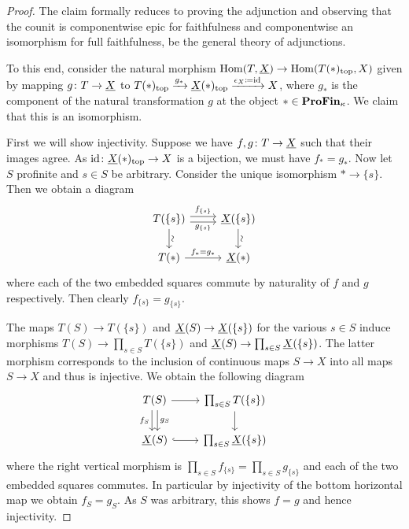 \begin{proof}
	The claim formally reduces to proving the adjunction and observing that the counit is componentwise epic for faithfulness and componentwise an isomorphism for full faithfulness, be the general theory of adjunctions.
	
	To this end, consider the natural morphism ${\operatorname{Hom}}(T, \underline{X}) \to {\operatorname{Hom}}({T(\ast)_\mathrm{top}}, X)$ given by mapping $g\colon T\to \underline{X}$ to ${T(\ast)_\mathrm{top}}\xrightarrow{g_\ast} {\underline{X}(\ast)_\mathrm{top}} \xrightarrow{\epsilon_X\coloneqq\mathrm{id}} X$, where $g_\ast$ is the component of the natural transformation $g$ at the object $\ast\in{\mathbf{ProFin}}_{\kappa}$. We claim that this is an isomorphism.
	
	First we will show injectivity. Suppose we have $f,g\colon T\to\underline{X}$ such that their images agree. As $\mathrm{id}\colon {\underline{X}(\ast)_\mathrm{top}}\to X$ is a bijection, we must have $f_\ast=g_\ast$. Now let $S$ profinite and $s\in S$ be arbitrary. Consider the unique isomorphism $\ast\to\{s\}$. Then we obtain a diagram
	$$\begin{tikzcd}
		T(\{s\})\ar[r, "f_{\{s\}}", shift left=.25em]\ar[r, "g_{\{s\}}", shift right=.25em, swap] \ar[d, "\sim" {rotate=90, anchor=north}]&\associated{X}(\{s\})\ar[d, "\sim" {rotate=90, anchor=north}]\\
		T(\ast)\ar[r, "f_\ast=g_\ast"] &\associated{X}(\ast)
	\end{tikzcd}$$
	where each of the two embedded squares commute by naturality of $f$ and $g$ respectively. Then clearly $f_{\{s\}}=g_{\{s\}}$. 
	
	The maps $T(S)\to T(\{s\})$ and $\underline{X}(S)\to \underline{X}(\{s\})$ for the various $s\in S$ induce morphisms $T(S)\to\prod_{s\in S} T(\{s\})$ and $\underline{X}(S)\to\prod_{s\in S} \underline{X}(\{s\})$. The latter morphism corresponds to the inclusion of continuous maps $S\to X$ into all maps $S\to X$ and thus is injective. We obtain the following diagram
	$$\begin{tikzcd}
		T(S) \ar[r]\ar[d, "f_S", shift right=.25em, swap]\ar[d, "g_S", shift left=.25em] &\prod_{s\in S} T(\{s\}) \ar[d]\\
		\associated{X}(S)\ar[r, hook] &\prod_{s\in S}\associated{X}(\{s\})
	\end{tikzcd}$$
	where the right vertical morphism is $\prod_{s\in S} f_{\{s\}} = \prod_{s\in S} g_{\{s\}}$ and each of the two embedded squares commutes. In particular by injectivity of the bottom horizontal map we obtain $f_S=g_S$. As $S$ was arbitrary, this shows $f=g$ and hence injectivity.
	

\end{proof}
